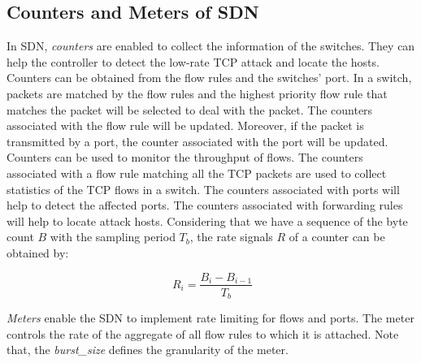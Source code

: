 \subsection{Counters and Meters of SDN}
In SDN, \emph{counters} are enabled to collect the information of the switches. They can help the controller to detect the low-rate TCP attack and locate the hosts. Counters can be obtained from the flow rules and the switches' port. In a switch, packets are matched by the flow rules and the highest priority flow rule that matches the packet will be selected to deal with the packet. The counters associated with the flow rule will be updated. Moreover, if the packet is transmitted by a port, the counter associated with the port will be updated. Counters can be used to monitor the throughput of flows. The counters associated with a flow rule matching all the TCP packets are used to collect statistics of the TCP flows in a switch. The counters associated with ports will help to detect the affected ports. The counters associated with forwarding rules will help to locate attack hosts. Considering that we have a sequence of the byte count $B$ with the sampling period $T_b$, the rate signals $R$ of a counter can be obtained by:

\vspace{-0.05in}
\begin{equation}\label{eq:sampling}
\ R_i=\frac{B_i - B_{i - 1}}{T_b}
\end{equation}

\textit{Meters} enable the SDN to implement rate limiting for flows and ports. The meter controls the rate of the aggregate of all flow rules to which it is attached. Note that, the \emph{burst\_size} defines the granularity of the meter. 
